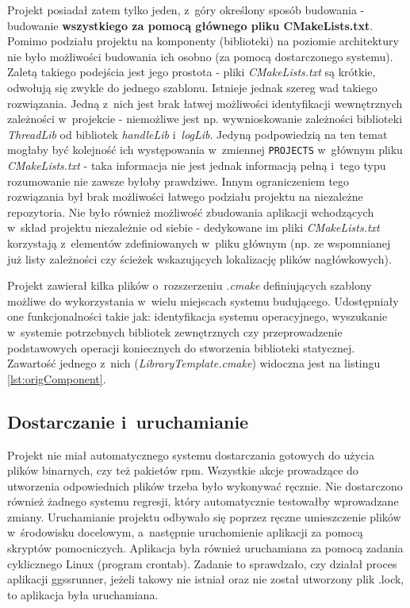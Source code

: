 Projekt posiadał zatem tylko jeden, z~góry określony sposób budowania - budowanie \textbf{wszystkiego za pomocą głównego pliku CMakeLists.txt}. Pomimo podziału projektu na komponenty (biblioteki) na poziomie architektury nie było możliwości budowania ich osobno (za pomocą dostarczonego systemu). Zaletą takiego podejścia jest jego prostota - pliki \textit{CMakeLists.txt} są krótkie, odwołują się zwykle do jednego szablonu. Istnieje jednak szereg wad takiego rozwiązania. Jedną z~nich jest brak łatwej możliwości identyfikacji wewnętrznych zależności w~projekcie - niemożliwe jest np. wywnioskowanie zależności biblioteki \textit{ThreadLib} od bibliotek \textit{handleLib} i~\textit{logLib}. Jedyną podpowiedzią na ten temat mogłaby być kolejność ich występowania w~zmiennej \lstinline{PROJECTS} w~głównym pliku \textit{CMakeLists.txt} - taka informacja nie jest jednak informacją pełną i~tego typu rozumowanie nie zawsze byłoby prawdziwe. Innym ograniczeniem tego rozwiązania był brak możliwości łatwego podziału projektu na niezależne repozytoria. Nie było również możliwość zbudowania aplikacji wchodzących w~skład projektu niezależnie od siebie - dedykowane im pliki \textit{CMakeLists.txt} korzystają z~elementów zdefiniowanych w~pliku głównym (np. ze wspomnianej już listy zależności czy ścieżek wskazujących lokalizację plików nagłówkowych). 

Projekt zawierał kilka plików o~rozszerzeniu \textit{.cmake} definiujących szablony możliwe do wykorzystania w~wielu miejscach systemu budującego. Udostępniały one funkcjonalności takie jak: identyfikacja systemu operacyjnego, wyszukanie w~systemie potrzebnych bibliotek zewnętrznych czy przeprowadzenie podstawowych operacji koniecznych do stworzenia biblioteki statycznej. Zawartość jednego z~nich (\textit{LibraryTemplate.cmake}) widoczna jest na listingu \ref{lst:origComponent}.


\subsection{Dostarczanie i~uruchamianie}

Projekt nie miał automatycznego systemu dostarczania gotowych do użycia plików binarnych, czy też pakietów \gls*{rpm}. Wszystkie akcje prowadzące do utworzenia odpowiednich plików trzeba było wykonywać ręcznie. Nie dostarczono również żadnego systemu regresji, który automatycznie testowałby wprowadzane zmiany. Uruchamianie projektu odbywało się poprzez ręczne umieszczenie plików w~środowisku docelowym, a~następnie uruchomienie aplikacji za pomocą skryptów pomocniczych. Aplikacja była również uruchamiana za pomocą zadania cyklicznego Linux (program crontab). Zadanie to sprawdzało, czy działał proces aplikacji ggssrunner, jeżeli takowy nie istniał oraz nie został utworzony plik .lock, to aplikacja była uruchamiana.

